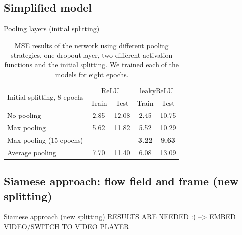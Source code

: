 \subsection{Simplified model}
\begin{frame}{Pooling layers (initial splitting)}
\begin{table}[!t]
\normalsize
\centering
\begin{tabular}{lcccc}
\toprule
\multirow{2}{*}{Initial splitting, 8 epochs}  & \multicolumn{2}{c}{$\mathrm{ReLU}$} & \multicolumn{2}{c}{$\mathrm{leakyReLU}$} \\
 & Train & Test & Train & Test\\
\midrule
No pooling & 2.85 & 12.08 & 2.45 & 10.75 \\
Max pooling & 5.62 & 11.82 & 5.52 & 10.29 \\
Max pooling (15 epochs) & - & - & \textbf{3.22} & \textbf{9.63} \\
Average pooling & 7.70 & 11.40 & 6.08 & 13.09\\
\bottomrule
\end{tabular}
\caption{MSE results of the network using different pooling strategies, one dropout layer, two different activation functions and 
the initial splitting. We trained each of the models for eight epochs.}
\end{table}
\end{frame}
\subsection{Siamese approach: flow field and frame (new splitting)}
\begin{frame}{Siamese approach (new splitting)}
RESULTS ARE NEEDED :) --> EMBED VIDEO/SWITCH TO VIDEO PLAYER
\end{frame}
